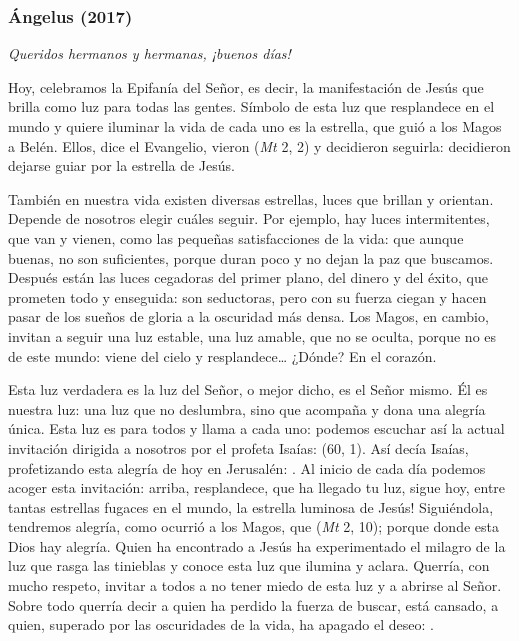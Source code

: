 			\subsubsection{Ángelus (2017)} 
			
				\begin{body}
					\emph{Queridos hermanos y hermanas, ¡buenos días!}
					
					Hoy, celebramos la Epifanía del Señor, es decir, la manifestación de Jesús que brilla como luz para todas las gentes. Símbolo de esta luz que resplandece en el mundo y quiere iluminar la vida de cada uno es la estrella, que guió a los Magos a Belén. Ellos, dice el Evangelio, vieron  (\emph{Mt} 2, 2) y decidieron seguirla: decidieron dejarse guiar por la estrella de Jesús.
					
					También en nuestra vida existen diversas estrellas, luces que brillan y orientan. Depende de nosotros elegir cuáles seguir. Por ejemplo, hay luces intermitentes, que van y vienen, como las pequeñas satisfacciones de la vida: que aunque buenas, no son suficientes, porque duran poco y no dejan la paz que buscamos. Después están las luces cegadoras del primer plano, del dinero y del éxito, que prometen todo y enseguida: son seductoras, pero con su fuerza ciegan y hacen pasar de los sueños de gloria a la oscuridad más densa. Los Magos, en cambio, invitan a seguir una luz estable, una luz amable, que no se oculta, porque no es de este mundo: viene del cielo y resplandece\ldots{} ¿Dónde? En el corazón.
					
					Esta luz verdadera es la luz del Señor, o mejor dicho, es el Señor mismo. Él es nuestra luz: una luz que no deslumbra, sino que acompaña y dona una alegría única. Esta luz es para todos y llama a cada uno: podemos escuchar así la actual invitación dirigida a nosotros por el profeta Isaías:  (60, 1). Así decía Isaías, profetizando esta alegría de hoy en Jerusalén: . Al inicio de cada día podemos acoger esta invitación: arriba, resplandece, que ha llegado tu luz, sigue hoy, entre tantas estrellas fugaces en el mundo, la estrella luminosa de Jesús! Siguiéndola, tendremos alegría, como ocurrió a los Magos, que  (\emph{Mt} 2, 10); porque donde esta Dios hay alegría. Quien ha encontrado a Jesús ha experimentado el milagro de la luz que rasga las tinieblas y conoce esta luz que ilumina y aclara. Querría, con mucho respeto, invitar a todos a no tener miedo de esta luz y a abrirse al Señor. Sobre todo querría decir a quien ha perdido la fuerza de buscar, está cansado, a quien, superado por las oscuridades de la vida, ha apagado el deseo: .
					

\end{body}
